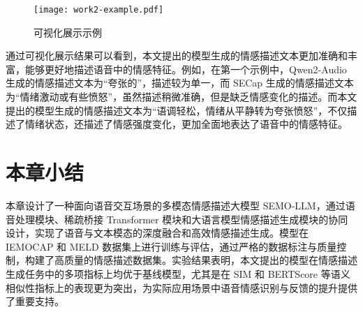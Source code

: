 \begin{figure}[ht]
  \centering
  \texttt{[image: work2-example.pdf]}
  \caption{可视化展示示例}
  \label{fig:work2-example}
\end{figure}

通过可视化展示结果可以看到，本文提出的模型生成的情感描述文本更加准确和丰富，能够更好地描述语音中的情感特征。例如，在第一个示例中，Qwen2-Audio 生成的情感描述文本为“夸张的”，描述较为单一，而 SECap 生成的情感描述文本为“情绪激动或有些愤怒”，虽然描述稍微准确，但是缺乏情感变化的描述。而本文提出的模型生成的情感描述文本为“语调轻松，情绪从平静转为夸张愤怒”，不仅描述了情绪状态，还描述了情感强度变化，更加全面地表达了语音中的情感特征。

\section{本章小结}

本章设计了一种面向语音交互场景的多模态情感描述大模型 SEMO-LLM，通过语音处理模块、稀疏桥接 Transformer 模块和大语言模型情感描述生成模块的协同设计，实现了语音与文本模态的深度融合和高效情感描述生成。模型在 IEMOCAP 和 MELD 数据集上进行训练与评估，通过严格的数据标注与质量控制，构建了高质量的情感描述数据集。实验结果表明，本文提出的模型在情感描述生成任务中的多项指标上均优于基线模型，尤其是在 SIM 和 BERTScore 等语义相似性指标上的表现更为突出，为实际应用场景中语音情感识别与反馈的提升提供了重要支持。
